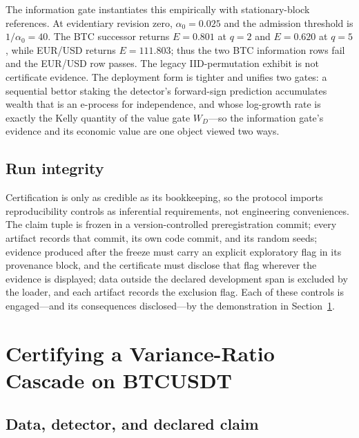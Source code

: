 \documentclass[3p]{elsarticle}
\begin{document}
The information gate instantiates this empirically with stationary-block
references. At evidentiary revision zero, $\alpha_0=0.025$ and the admission
threshold is $1/\alpha_0=40$. The BTC successor returns $E=0.801$ at
$q{=}2$ and $E=0.620$ at $q{=}5$, while EUR/USD returns $E=111.803$; thus the
two BTC information rows fail and the EUR/USD row passes. The legacy
IID-permutation exhibit is not certificate evidence. The deployment form is tighter and
unifies two gates: a sequential bettor staking the detector's forward-sign
prediction accumulates wealth that is an e-process for independence, and
whose log-growth rate is exactly the Kelly quantity of the value gate
$W_D$---so the information gate's evidence and its economic value are one
object viewed two ways.

\subsection{Run integrity}
\label{sec:integrity}

Certification is only as credible as its bookkeeping, so the protocol imports
reproducibility controls as inferential requirements, not engineering
conveniences. The claim tuple is frozen in a version-controlled
preregistration commit; every artifact records that commit, its own code
commit, and its random seeds; evidence produced after the freeze must carry
an explicit exploratory flag in its provenance block, and the certificate
must disclose that flag wherever the evidence is displayed; data outside the
declared development span is excluded by the loader, and each artifact
records the exclusion flag. Each of these controls is engaged---and its
consequences disclosed---by the demonstration in
Section~\ref{sec:empirical}.

\section{Certifying a Variance-Ratio Cascade on BTCUSDT}
\label{sec:empirical}

\subsection{Data, detector, and declared claim}
\end{document}
